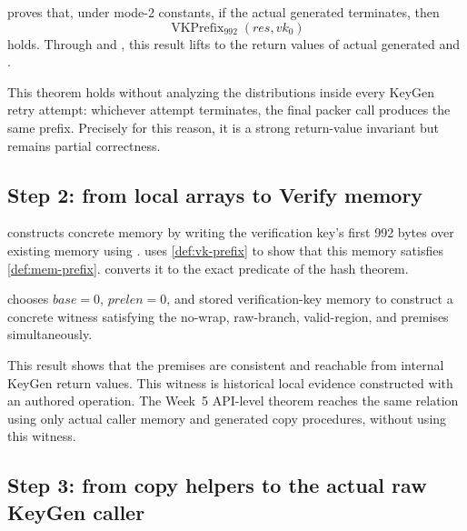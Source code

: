 \begin{verified}
\label{thm:packer-prefix}
 proves that, under mode-2 constants,
if the actual generated  terminates, then
\[
  \operatorname{VKPrefix}_{992}(res,vk_0)
\]
holds. Through  and
, this result lifts to the
return values of actual generated  and
.
\end{verified}

This theorem holds without analyzing the distributions inside every KeyGen retry
attempt: whichever attempt terminates, the final packer call produces the same
prefix. Precisely for this reason, it is a strong return-value invariant but
remains partial correctness.

\subsection{Step 2: from local arrays to Verify memory}

 constructs concrete memory
by writing the verification key's first 992 bytes over existing memory using
. 
uses \cref{def:vk-prefix} to show that this memory satisfies
\cref{def:mem-prefix}.  converts it
to the exact predicate of the hash theorem.

\begin{verified}
\label{thm:memory-witness}
 chooses
\(base=0\), \(prelen=0\), and stored verification-key memory to construct a
concrete witness satisfying the no-wrap, raw-branch, valid-region, and
 premises simultaneously.
\end{verified}

This result shows that the premises are consistent and reachable from internal
KeyGen return values. This witness is historical local evidence constructed with
an authored  operation. The Week~5 API-level theorem reaches
the same relation using only actual caller memory and generated copy procedures,
without using this witness.

\subsection{Step 3: from copy helpers to the actual raw KeyGen caller}

